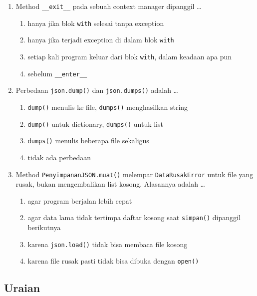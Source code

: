 \begin{enumerate}
  \item Method \texttt{\_\_exit\_\_} pada sebuah context manager dipanggil \ldots
  \begin{enumerate}[label=\alph*.,itemsep=0pt]
    \item hanya jika blok \texttt{with} selesai tanpa exception
    \item hanya jika terjadi exception di dalam blok \texttt{with}
    \item setiap kali program keluar dari blok \texttt{with}, dalam keadaan apa pun
    \item sebelum \texttt{\_\_enter\_\_}
  \end{enumerate}

  \item Perbedaan \texttt{json.dump()} dan \texttt{json.dumps()} adalah \ldots
  \begin{enumerate}[label=\alph*.,itemsep=0pt]
    \item \texttt{dump()} menulis ke file, \texttt{dumps()} menghasilkan string
    \item \texttt{dump()} untuk dictionary, \texttt{dumps()} untuk list
    \item \texttt{dumps()} menulis beberapa file sekaligus
    \item tidak ada perbedaan
  \end{enumerate}

  \item Method \texttt{PenyimpananJSON.muat()} melempar \texttt{DataRusakError} untuk file yang rusak, bukan mengembalikan list kosong. Alasannya adalah \ldots
  \begin{enumerate}[label=\alph*.,itemsep=0pt]
    \item agar program berjalan lebih cepat
    \item agar data lama tidak tertimpa daftar kosong saat \texttt{simpan()} dipanggil berikutnya
    \item karena \texttt{json.load()} tidak bisa membaca file kosong
    \item karena file rusak pasti tidak bisa dibuka dengan \texttt{open()}
  \end{enumerate}
\end{enumerate}

\subsection{Uraian}

